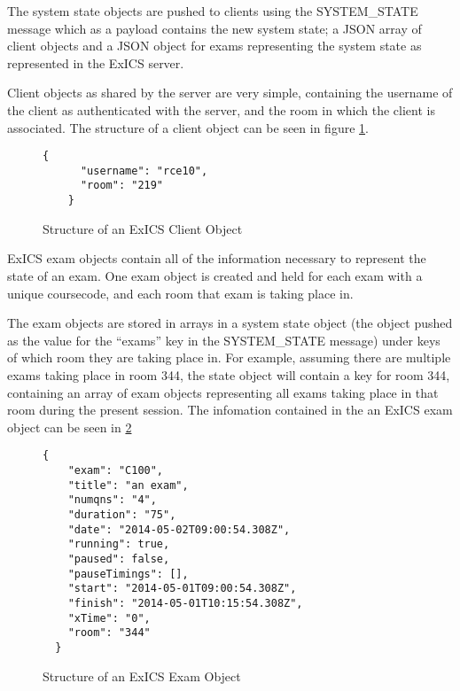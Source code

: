 The system state objects are pushed to clients using the SYSTEM\_STATE message which as a payload contains the new system state; a JSON array of client objects and a JSON object for exams representing the system state as represented in the ExICS server.

\FloatBarrier

Client objects as shared by the server are very simple, containing the username of the client as authenticated with the server, and the room in which the client is associated.  The structure of a client object can be seen in figure \ref{fig:exics_client}.

\begin{figure}[h]
  \lstset{language=JSON}
  \begin{lstlisting}[tabsize=2,breaklines=true]
    {
      "username": "rce10",
      "room": "219"
    }
  \end{lstlisting}
  \caption{Structure of an ExICS Client Object}
  \label{fig:exics_client}
\end{figure}

\FloatBarrier

\FloatBarrier

ExICS exam objects contain all of the information necessary to represent the state of an exam.  One exam object is created and held for each exam with a unique coursecode, and each room that exam is taking place in.

The exam objects are stored in arrays in a system state object (the object pushed as the value for the ``exams'' key in the SYSTEM\_STATE message) under keys of which room they are taking place in.  For example, assuming there are multiple exams taking place in room 344, the state object will contain a key for room 344, containing an array of exam objects representing all exams taking place in that room during the present session.  The infomation contained in the an ExICS exam object can be seen in \ref{fig:exics_exam}

\begin{figure}[h]
  \lstset{language=JSON}
  \begin{lstlisting}[tabsize=2,breaklines=true]
  {
    "exam": "C100",
    "title": "an exam",
    "numqns": "4",
    "duration": "75",
    "date": "2014-05-02T09:00:54.308Z",
    "running": true,
    "paused": false,
    "pauseTimings": [],
    "start": "2014-05-01T09:00:54.308Z",
    "finish": "2014-05-01T10:15:54.308Z",
    "xTime": "0",
    "room": "344"
  }
  \end{lstlisting}
  \caption{Structure of an ExICS Exam Object}
  \label{fig:exics_exam}
\end{figure}

